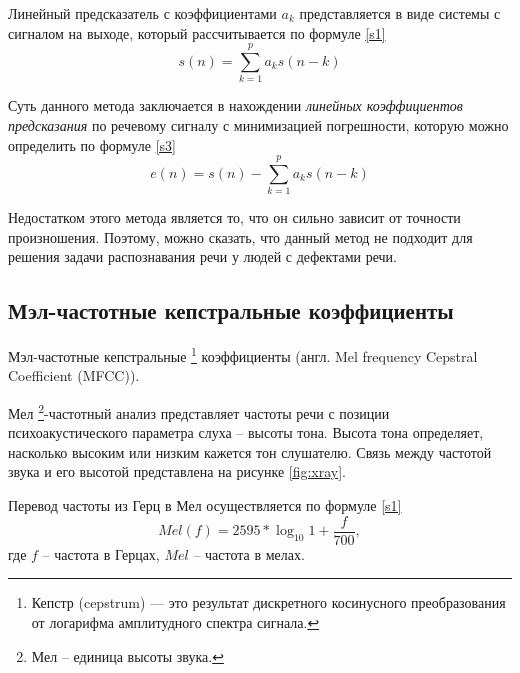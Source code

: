 Линейный предсказатель с коэффициентами $a_k$ представляется в виде системы с сигналом на выходе, который рассчитывается по формуле \eqref{s1}
\begin{equation}
	\label{s1}
	s(n) = \sum_{k = 1}^{p} a_k s(n - k)
\end{equation}

Суть данного метода заключается в нахождении \textit{линейных коэффициентов предсказания} по речевому сигналу с минимизацией погрешности, которую можно определить по формуле \eqref{s3}
\begin{equation}
	\label{s3}
	e(n) = s(n) - \sum_{k = 1}^{p} a_k s(n - k)
\end{equation}

Недостатком этого метода является то, что он сильно зависит от точности произношения. Поэтому, можно сказать, что данный метод не подходит для решения задачи распознавания речи у людей с дефектами речи.

\subsection{Мэл-частотные кепстральные коэффициенты} \label{1}
Мэл-частотные кепстральные \footnote{Кепстр (cepstrum) — это результат дискретного косинусного преобразования от логарифма амплитудного спектра сигнала.} коэффициенты (англ. Mel frequency \newline Cepstral Coefficient (MFCC)).

Мел \footnote{Мел -- единица высоты звука.}-частотный анализ представляет частоты речи с позиции психоакустического параметра слуха – высоты тона. Высота тона определяет, насколько высоким или низким кажется тон слушателю. Связь между частотой звука и его высотой представлена на рисунке \ref{fig:xray}. \cite{methodisb} \cite{methodisb2}

Перевод частоты из Герц в Мел осуществляется по формуле  \eqref{s1}
\begin{equation}
	\label{s1}
	Mel(f) = 2595 * \log_{10}{1 + \frac{f}{700}},
\end{equation}
где $f$ -- частота в Герцах, $Mel$ -- частота в мелах.

